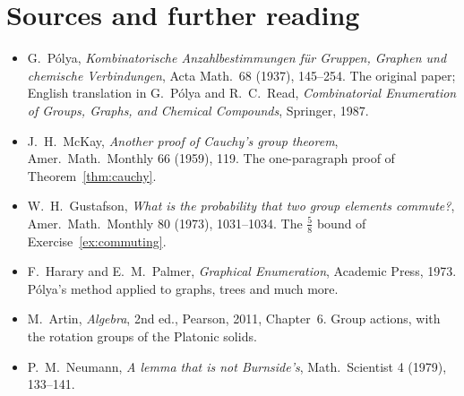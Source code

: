 \section*{Sources and further reading}

\begin{itemize}
\item G.~P\'olya, \emph{Kombinatorische Anzahlbestimmungen f\"ur Gruppen, Graphen und chemische Verbindungen}, Acta Math.\ 68 (1937), 145--254. The original paper; English translation in G.~P\'olya and R.~C.~Read, \emph{Combinatorial Enumeration of Groups, Graphs, and Chemical Compounds}, Springer, 1987.
\item J.~H.~McKay, \emph{Another proof of Cauchy's group theorem}, Amer.\ Math.\ Monthly 66 (1959), 119. The one-paragraph proof of Theorem~\ref{thm:cauchy}.
\item W.~H.~Gustafson, \emph{What is the probability that two group elements commute?}, Amer.\ Math.\ Monthly 80 (1973), 1031--1034. The $\frac58$ bound of Exercise~\ref{ex:commuting}.
\item F.~Harary and E.~M.~Palmer, \emph{Graphical Enumeration}, Academic Press, 1973. P\'olya's method applied to graphs, trees and much more.
\item M.~Artin, \emph{Algebra}, 2nd ed., Pearson, 2011, Chapter~6. Group actions, with the rotation groups of the Platonic solids.
\item P.~M.~Neumann, \emph{A lemma that is not Burnside's}, Math.\ Scientist 4 (1979), 133--141.
\end{itemize}
